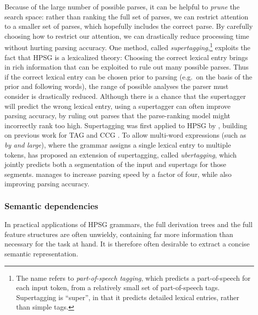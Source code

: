 \documentclass[output=paper,nonflat]{langsci/langscibook}
\begin{document}
Because of the large number of possible parses,
it can be helpful to \textit{prune} the search space:
rather than ranking the full set of parses,
we can restrict attention to a smaller set of parses,
which hopefully includes the correct parse.
By carefully choosing how to restrict our attention,
we can drastically reduce processing time without hurting parsing accuracy.
One method, called \textit{supertagging},\footnote{%
	The name refers to \textit{part-of-speech tagging},
	which predicts a part-of-speech for each input token,
	from a relatively small set of part-of-speech tags.
	Supertagging is ``super'', in that it predicts detailed lexical entries, rather than simple tags.
}
exploits the fact that HPSG is a lexicalized theory: Choosing the correct lexical entry brings in rich information that can be exploited to rule out many possible parses.
Thus if the correct lexical entry can be chosen prior to parsing (e.g.\ on the basis of the prior and following words), the range of possible analyses the parser must consider is drastically reduced.
Although there is a chance that the supertagger will predict the wrong lexical entry,
using a supertagger can often improve parsing accuracy,
by ruling out parses that the parse-ranking model might incorrectly rank too high.
Supertagging was first applied to HPSG by \citet{matsuzaki2007supertag},
building on previous work for TAG \citep{bangalore1999supertag}
and CCG \citep{clark2004supertag}.
To allow multi-word expressions (such as \textit{by and large}),
where the grammar assigns a single lexical entry to multiple tokens,
\citet{dridan2013ubertag} has proposed an extension of supertagging, called \textit{ubertagging},
which jointly predicts both a segmentation of the input and supertags for those segments.
\citeauthor{dridan2013ubertag} manages to increase parsing speed by a factor of four,
while also improving parsing accuracy.


\subsubsection{Semantic dependencies}
\label{cl:prac:dep}

In practical applications of HPSG grammars,
the full derivation trees and the full feature structures are often unwieldy,
containing far more information than necessary for the task at hand.
It is therefore often desirable to extract a concise semantic representation.
\end{document}
